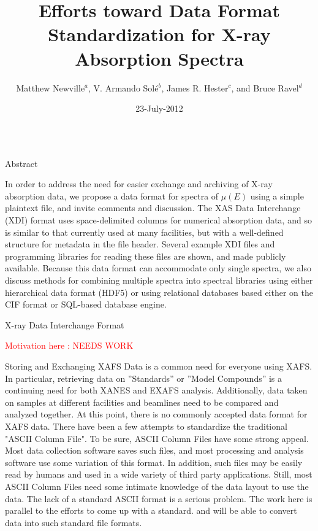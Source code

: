 \documentclass[final]{beamer}
\title[XAFS Data Formats Poster]{Efforts toward Data Format Standardization for X-ray Absorption Spectra}
\author[Newville, Sol\'e, Ravel, and Hester]{
Matthew Newville${}^{a}$, V. Armando  Sol\'e${}^{b}$,  James R. Hester${}^{c}$, and Bruce Ravel${}^{d}$}
\institute[]{ 
  ${}^{a}$Center for Advanced Radiation Sources, University of  Chicago, USA, \par
  ${}^{b}$European Synchrotron Radiation Facility, Grenoble, France, \par
  ${}^{c}$Bragg Institute, Australian Nuclear Science and Technology Organization, Kirrawee, Australia, \par
  ${}^{d}$National Institute  of Standards and Technology, Gaithersburg,
  USA
}
\date{23-July-2012}
\newcommand{\Color}[2]{{\textcolor{#1}{#2}}}
\newcommand{\Red}[1]{{\Color{Red}{#1}}}
\begin{document}
  \begin{frame}{}
    \vspace{2mm}
    \begin{columns}[t]
      \begin{column}{.52\linewidth}
        \begin{block}{\large Abstract}

          In order to address the need for easier exchange and archiving of
          X-ray absorption data, we propose a data format for spectra of
          $\mu(E)$ using a simple plaintext file, and invite comments and
          discussion. The XAS Data Interchange (XDI) format uses
          space-delimited columns for numerical absorption data, and so is
          similar to that currently used at many facilities, but with a
          well-defined structure for metadata in the file header.  Several
          example XDI files and programming libraries for reading these
          files are shown, and made publicly available.  Because this data
          format can accommodate only single spectra, we also discuss
          methods for combining multiple spectra into spectral libraries
          using either hierarchical data format (HDF5) or using relational
          databases based either on the CIF format or SQL-based database
          engine.

        \end{block}
        
        \vspace{2mm}
        
        \begin{block}{\large X-ray Data Interchange Format}
        
          {\Red{Motivation here :   NEEDS WORK}}
          
          
          Storing and Exchanging XAFS Data is a common need for everyone
          using XAFS.  In particular, retrieving data on ''Standards'' or
          ''Model Compounds'' is a continuing need for both XANES and EXAFS
          analysis.  Additionally, data taken on samples at different
          facilities and beamlines need to be compared and analyzed together.
          At this point, there is no commonly accepted data format for XAFS
          data.  There have been a few attempts to standardize the
          traditional "ASCII Column File".  To be sure, ASCII Column Files
          have some strong appeal. Most data collection software saves such
          files, and most processing and analysis software use some variation
          of this format.  In addition, such files may be easily read by
          humans and used in a wide variety of third party
          applications. Still, most ASCII Column Files need some intimate
          knowledge of the data layout to use the data.  The lack of a
          standard ASCII format is a serious problem. The work here is
          parallel to the efforts to come up with a standard. and will be
          able to convert data into such standard file formats.
          


\end{block}
\end{column}
\end{columns}
\end{frame}
\end{document}
